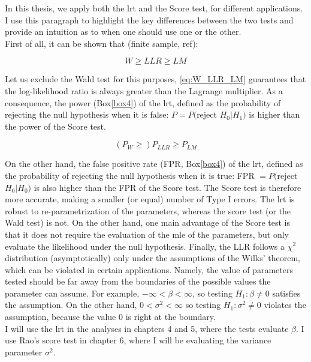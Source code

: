 In this thesis, we apply both the \gls{lrt} and the Score test, for different applications.
I use this paragraph to highlight the key differences between the two tests and provide an intuition as to when one should use one or the other.\\

First of all, it can be shown that (finite sample, ref):

\begin{equation}\label{eq:W_LLR_LM}
    W \geq LLR \geq LM
\end{equation}

Let us exclude the Wald test for this purposes, \eqref{eq:W_LLR_LM} guarantees that the log-likelihood ratio is always greater than the Lagrange multiplier.
As a consequence, the power (Box\ref{box4}) of the \gls{lrt}, defined as the probability of rejecting the null hypothesis when it is false: $P = P($reject $H_0 | H_1)$ is higher than the power of the Score test.

\begin{equation}
    (P_W \geq) P_{LLR} \geq P_{LM}
\end{equation}

On the other hand, the false positive rate (FPR, Box\ref{box4}) of the \gls{lrt}, defined as the probability of rejecting the null hypothesis when it is true: FPR $= P($reject $H_0 | H_0)$ is also higher than the FPR of the Score test.
The Score test is therefore more accurate, making a smaller (or equal) number of Type I errors. The \gls{lrt} is robust to re-parametrization of the parameters, whereas the score test (or the Wald test) is not. On the other hand, one main advantage of the Score test is that it does not require the evaluation of the \gls{mle} of the parameters, but only evaluate the likelihood under the null hypothesis.
Finally, the LLR follows a $\chi^2$ distribution (asymptotically) only under the assumptions of the Wilks' theorem, which can be violated in certain applications.
Namely, the value of parameters tested should be far away from the boundaries of the possible values the parameter can assume.
For example, $-\infty < \beta < \infty$, so testing $H_1: \beta \neq 0$ satisfies the assumption.
On the other hand, $0 < \sigma^2 < \infty$ so testing $H_1: \sigma^2 \neq 0$ violates the assumption, because the value $0$ is right at the boundary.\\

I will use the \gls{lrt} in the analyses in chapters 4 and 5, where the tests evaluate $\beta$.
I use Rao's score test in chapter 6, where I will be evaluating the variance parameter $\sigma^2$.



